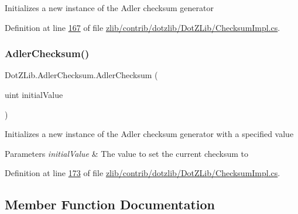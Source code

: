 Initializes a new instance of the Adler checksum generator 



Definition at line \hyperlink{zlib_2contrib_2dotzlib_2_dot_z_lib_2_checksum_impl_8cs_source_l00167}{167} of file \hyperlink{zlib_2contrib_2dotzlib_2_dot_z_lib_2_checksum_impl_8cs_source}{zlib/contrib/dotzlib/\+Dot\+Z\+Lib/\+Checksum\+Impl.\+cs}.

\mbox{\label{class_dot_z_lib_1_1_adler_checksum_ab983bcafef50a5f578398d2aa83d7433}} 
\subsubsection{\texorpdfstring{Adler\+Checksum()}{AdlerChecksum()}\hspace{0.1cm}{\footnotesize\ttfamily [4/4]}}
{\footnotesize\ttfamily Dot\+Z\+Lib.\+Adler\+Checksum.\+Adler\+Checksum (\begin{DoxyParamCaption}\item[{uint}]{initial\+Value }\end{DoxyParamCaption})\hspace{0.3cm}{\ttfamily [inline]}}



Initializes a new instance of the Adler checksum generator with a specified value 


\begin{DoxyParams}{Parameters}
{\em initial\+Value} & The value to set the current checksum to\\
\hline
\end{DoxyParams}


Definition at line \hyperlink{zlib_2contrib_2dotzlib_2_dot_z_lib_2_checksum_impl_8cs_source_l00173}{173} of file \hyperlink{zlib_2contrib_2dotzlib_2_dot_z_lib_2_checksum_impl_8cs_source}{zlib/contrib/dotzlib/\+Dot\+Z\+Lib/\+Checksum\+Impl.\+cs}.



\subsection{Member Function Documentation}
\mbox{\label{class_dot_z_lib_1_1_adler_checksum_a757dd32613c477dcb7384b206b72fc34}} 
